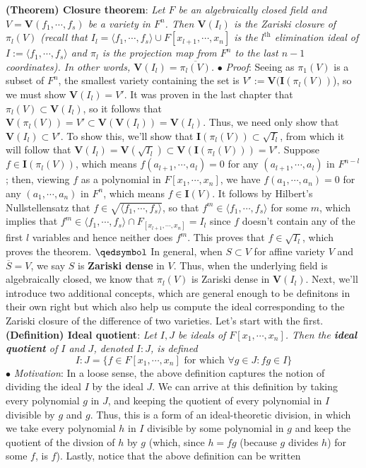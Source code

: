 \documentclass{article}
\newcommand*{\tb}{\textbf}
\newcommand*{\ti}{\textit}
\newcommand*{\n}{\newline}
\newcommand*{\nn}{\newline \newline}
\newcommand*{\Fx}{\ensuremath{F[x_1, \cdots, x_n]}}
\newcommand*{\fs}{f_1, \cdots, f_s}
\newcommand*{\lfsr}{\langle f_1, \cdots, f_s \rangle}
\newcommand*{\V}{\ensuremath{\mathbf{V}}}
\newcommand*{\I}{\ensuremath{\mathbf{I}}}
\begin{document}
\nn
\tb{(Theorem) Closure theorem}: \ti{Let $ F $ be an algebraically closed field and $ V = \V(\fs) $ be a variety in $ F^n $. Then $ \V(I_l) $ is the Zariski closure of $ \pi_l(V) $ (recall that $ I_l = \lfsr \cup F[x_{l + 1}, \cdots, x_n] $ is the $ l^{\text{th}} $ elimination ideal of $ I := \lfsr $ and $ \pi_l $ is the projection map from $ F^n $ to the last $ n - 1 $ coordinates). In other words, $ \V(I_l) = \overline{\pi_l(V)} $.}
\n
\indent $ \bullet $ \ti{Proof}: Seeing as $ \pi_1(V) $ is a subset of $ F^n $, the smallest variety containing the set is $ V' := \V(\I(\pi_l(V)) $), so we must show $ \V(I_l) = V' $. It was proven in the last chapter that $ \pi_l(V) \subset \V(I_l) $, so it follows that $ \V(\pi_l(V)) = V' \subset \V(\V(I_l)) = \V(I_l) $. Thus, we need only show that $ \V(I_l) \subset V' $. To show this, we'll show that $ \I(\pi_l(V)) \subset \sqrt{I_l} $, from which it will follow that $ \V(I_l) = \V(\sqrt{I_l}) \subset \V(\I(\pi_l(V))) = V' $. 
\n
Suppose $ f \in \I(\pi_l(V)) $, which means $ f(a_{l + 1}, \cdots, a_l) = 0 $ for any $ (a_{l + 1}, \cdots, a_l) $ in $ F^{n - l} $; then, viewing $ f $ as a polynomial in $ \Fx $, we have $ f(a_1, \cdots, a_n) = 0 $ for any $ (a_1, \cdots, a_n) $ in $ F^n $, which means $ f \in \I(V) $. It follows by Hilbert's Nullstellensatz that $ f \in \sqrt{\lfsr} $, so that $ f^m \in \lfsr $ for some $ m $, which implies that $ f^m \in \lfsr \cap F_[x_{l + 1}, \cdots, x_n] = I_l $ since $ f $ doesn't contain any of the first $ l $ variables and hence neither does $ f^m $. This proves that $ f \in \sqrt{I_l} $, which proves the theorem. $ \qedsymbol $
\nn
In general, when $ S \subset V $ for affine variety $ V $ and $ \overline{S} = V $, we say $ S $ is \tb{Zariski dense} in $ V $. Thus, when the underlying field is algebraically closed, we know that $ \pi_l(V) $ is Zariski dense in $ \V(I_l) $. Next, we'll introduce two additional concepts, which are general enough to be definitons in their own right but which also help us compute the ideal corresponding to the Zariski closure of the difference of two varieties. Let's start with the first.
\nn
\tb{(Definition) Ideal quotient}: \ti{Let $ I, J $ be ideals of $ \Fx $. Then the \tb{ideal quotient} of $ I $ and $ J $, denoted $ I : J $, is defined}
$$ I : J = \{ f \in \Fx \text{ for which } \forall g \in J: f g \in I \} $$
\indent $ \bullet $ \ti{Motivation}: In a loose sense, the above definition captures the notion of dividing the ideal $ I $ by the ideal $ J $. We can arrive at this definition by taking every polynomial $ g $ in $ J $, and keeping the quotient of every polynomial in $ I $ divisible by $ g $ and $ g $. Thus, this is a form of an ideal-theoretic division, in which we take every polynomial $ h $ in $ I $ divisible by some polynomial in $ g $ and keep the quotient of the divsion of $ h $ by $ g $ (which, since $ h = f g $ (because $ g $ divides $ h $) for some $ f $, is $ f $). Lastly, notice that the above definition can be written
\end{document}

